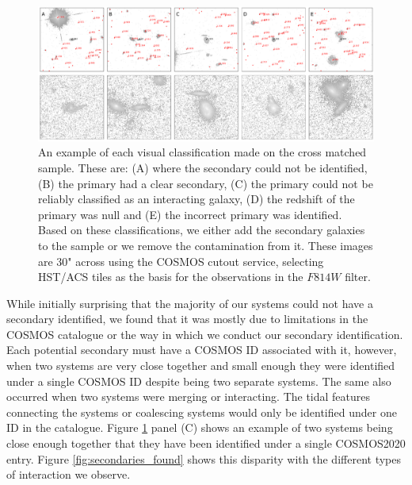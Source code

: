 \begin{figure}
\centering
\includegraphics[width=\textwidth]{Chapter3/figures/cutouts_ex.pdf}
\caption[An example of each visual classification made on the cross matched sample.]{An example of each visual classification made on the cross matched sample. These are: (A) where the secondary could not be identified, (B) the primary had a clear secondary, (C) the primary could not be reliably classified as an interacting galaxy, (D) the redshift of the primary was null and (E) the incorrect primary was identified. Based on these classifications, we either add the secondary galaxies to the sample or we remove the contamination from it. These images are 30" across using the COSMOS cutout service, selecting HST/ACS tiles as the basis for the observations in the $F814W$ filter.}
\label{fig:secondary_selection}
\end{figure}

While initially surprising that the majority of our systems could not have a secondary identified, we found that it was mostly due to limitations in the COSMOS catalogue or the way in which we conduct our secondary identification. Each potential secondary must have a COSMOS ID associated with it, however, when two systems are very close together and small enough they were identified under a single COSMOS ID despite being two separate systems. The same also occurred when two systems were merging or interacting. The tidal features connecting the systems or coalescing systems would only be identified under one ID in the catalogue. Figure \ref{fig:secondary_selection} panel (C) shows an example of two systems being close enough together that they have been identified under a single COSMOS2020 entry. Figure \ref{fig:secondaries_found} shows this disparity with the different types of interaction we observe.

